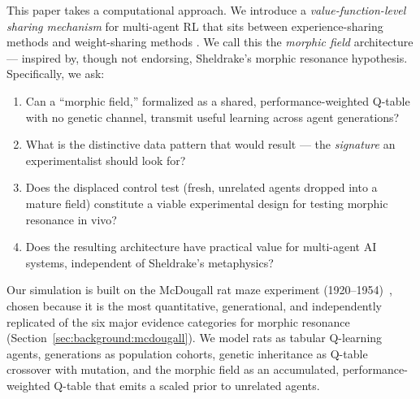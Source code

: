 \documentclass[twoside,11pt]{article}
\begin{document}
This paper takes a computational approach.  We introduce a
\emph{value-function-level sharing mechanism} for multi-agent RL that sits
between experience-sharing methods \citep[SUPER;][]{gerstgrasser2023} and
weight-sharing methods \citep[FedAvg;][]{mcmahan2017}.  We call this the
\emph{morphic field} architecture --- inspired by, though not endorsing,
Sheldrake's morphic resonance hypothesis.  Specifically, we ask:

\begin{enumerate}[leftmargin=2em]
    \item Can a ``morphic field,'' formalized as a shared, performance-weighted
          Q-table with no genetic channel, transmit useful learning across
          agent generations?
    \item What is the distinctive data pattern that would result --- the
          \emph{signature} an experimentalist should look for?
    \item Does the displaced control test (fresh, unrelated agents dropped into
          a mature field) constitute a viable experimental design for testing
          morphic resonance in vivo?
    \item Does the resulting architecture have practical value for multi-agent
          AI systems, independent of Sheldrake's metaphysics?
\end{enumerate}

Our simulation is built on the McDougall rat maze experiment
(1920--1954)~\citep{mcdougall1938}, chosen because it is the most
quantitative, generational, and independently replicated of the six major
evidence categories for morphic resonance
(Section~\ref{sec:background:mcdougall}).  We model rats as tabular Q-learning
agents, generations as population cohorts, genetic inheritance as Q-table
crossover with mutation, and the morphic field as an accumulated,
performance-weighted Q-table that emits a scaled prior to unrelated agents.
\end{document}

